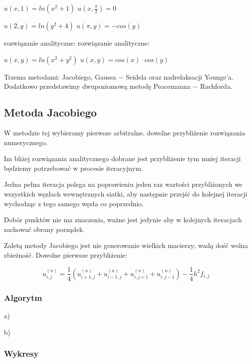 $u(x,1) = ln(x^2 + 1)$ \hspace{3.28cm} $u(x,\frac{\pi}{2}) = 0$

$u(2,y) = ln(y^2 + 4)$ \hspace{3.3cm} $u(\pi,y) = -cos(y)$

rozwiązanie analityczne: \hspace{2.6cm} rozwiązanie analityczne:

$u(x,y) = ln(x^2 + y^2)$ \hspace{3.1cm} $u(x,y) = cos(x)\cdot cos(y)$

\vspace{0.5cm}

Trzema metodami: Jacobiego, Gaussa $-$ Seidela oraz nadrelaksacji Younge'a. Dodatkowo przedstawimy dwupoziomową metodę Peacemanna $-$ Rachforda.

\subsection{Metoda Jacobiego}

W metodzie tej wybieramy pierwsze arbitralne, dowolne przybliżenie rozwiązania numerycznego.

Im bliżej rozwiązania analitycznego dobrane jest przybliżenie tym mniej iteracji będziemy potrzebować w procesie iteracyjnym.

Jedna pełna iteracja polega na poprawieniu jeden raz wartości przybliżonych we wszystkich węzłach wewnętrznych siatki, aby następnie przejść do kolejnej iteracji wychodząc z tego samego węzła co poprzednio.

Dobór punktów nie ma znaczenia, ważne jest jedynie aby w kolejnych iteracjach zachować obrany porządek.

Zaletą metody Jacobiego jest nie generowanie wielkich macierzy; wadą dość wolna zbieżność.
\newpage
Dowolne pierwsze przybliżenie:

$$u_{i,j}^{(n)} = \frac{1}{4}(u_{i+1,j}^{(n)} + u_{i-1,j}^{(n)} + u_{i,j+1}^{(n)} + u_{i,j-1}^{(n)}) - \frac{1}{4}h^2f_{i,j}$$

\subsubsection{Algorytm}

a)


\newpage
b)


\newpage
\subsubsection{Wykresy}

